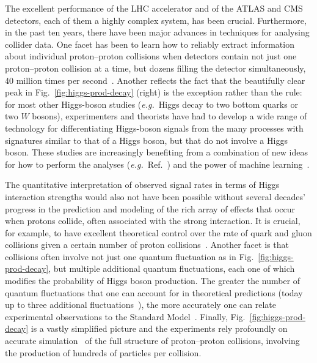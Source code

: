 \documentclass{article}
\begin{document}
The excellent performance of the LHC accelerator and of the ATLAS and
CMS detectors, each of them a highly complex system, has been crucial.
%
Furthermore, in the past ten years, there have been major advances in
techniques for analysing collider data.
%
One facet has been to learn how to reliably extract information about
individual proton--proton collisions when detectors contain not just
one proton--proton collision at a time, but dozens filling the
detector simultaneously, 40 million times per
second~\cite{Cacciari:2007fd,Bertolini:2014bba}.
%
Another reflects the fact that the beautifully clear peak in
Fig.~\ref{fig:higgs-prod-decay} (right) is the exception rather than
the rule:
%
for most other Higgs-boson studies ({\it e.g.}\ Higgs decay to
two bottom quarks or
two $W$ bosons), experimenters and theorists have
had to develop a wide range of technology for differentiating
Higgs-boson signals from the many processes with signatures
similar to that of a Higgs boson, but that do not involve a Higgs
boson.
%
These studies are increasingly benefiting from
a combination of new ideas for
how to perform the analyses ({\it e.g.}\ Ref.~\cite{Marzani:2019hun})
and the power of machine
learning~\cite{Guest:2018yhq}.

%
The quantitative interpretation of observed signal rates in terms of
Higgs interaction strengths would also not have been possible without
several decades' progress in the prediction and modeling of the rich
array of
effects that occur when protons collide, often associated with the
strong interaction.
%
It is crucial, for example, to have excellent theoretical control over
the rate of quark and gluon collisions given a certain number of
proton collisions~\cite{Gao:2017yyd,Ball:2022hsh}.
%
Another facet is that collisions often involve not just one quantum
fluctuation as in Fig.~\ref{fig:higgs-prod-decay}, but multiple
additional quantum fluctuations, each one of which modifies the
probability of Higgs boson production.
%
The greater the number of quantum fluctuations that one can account
for in theoretical predictions (today up to three additional
fluctuations~\cite{Anastasiou:2015vya}), the more accurately one can
relate experimental observations to the Standard
Model~\cite{Heinrich:2020ybq,LHCHiggsCrossSectionWorkingGroup:2016ypw}.
%
Finally, Fig.~\ref{fig:higgs-prod-decay} is a vastly
simplified picture and the experiments rely profoundly on
accurate simulation~\cite{Buckley:2011ms,Campbell:2022qmc} of the full
structure of proton--proton collisions, involving the production of
hundreds of particles per collision.
% 
\end{document}
